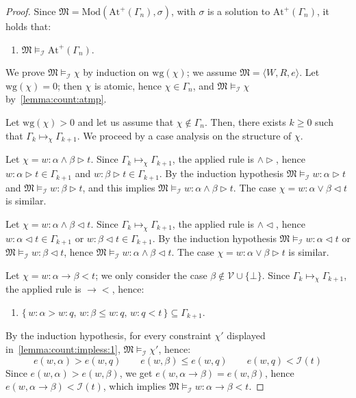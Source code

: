 \documentclass[copyright,creativecommons]{eptcs}
\newcommand{\PV}{\Vcal}
\newcommand{\gt}{\rhd}
\newcommand{\lt}{\lhd}
\newcommand{\stru}[1]{\langle #1 \rangle} %
\newcommand{\wg}[1]{\mathrm{wg}(#1)}
\newcommand{\Atmp}[1]{\mathrm{At}^{+}\!(#1)}
\newcommand{\Modname}{\mathrm{Mod}}
\newcommand{\Mod}[1]{\Modname(#1)}
\newcommand{\app}[3]{#2\mapsto_{#1} #3}
\newcommand{\M}{\mathfrak{M}}
\renewcommand{\a}{\alpha}
\renewcommand{\b}{\beta}
\newcommand{\s}{\sigma}
\newcommand{\G}{\Gamma}
\newcommand{\Ical}{\mathcal{I}}
\newcommand{\Vcal}{\mathcal{V}}
\begin{document}
\begin{proof}
  Since $\M=\Mod{\Atmp{\G_n},\s}$, with $\s$ is a solution to $\Atmp{\G_n}$,
  it holds that:
  \begin{enumerate}[label=(\arabic*), ref=(\arabic*),leftmargin=*]
  \item\label{lemma:count:atmp}
    $\M\models_\Ical \Atmp{\G_n}$.
  \end{enumerate}
  We prove  $\M\models_\Ical \chi$ by induction on $\wg{\chi}$;
  we assume $\M=\stru{W,R,e}$.
  Let $\wg{\chi}=0$; then $\chi$ is atomic, hence $\chi\in\G_n$,
  and $\M\models_\Ical \chi$ by~\ref{lemma:count:atmp}.
  
  Let $\wg{\chi}>0$ and let us assume that  $\chi\not\in \G_n$.
  Then, there exists $k \geq  0$ such that
  $\app{\chi}{\G_k}{\G_{k+1}}$. 
  We proceed by a case analysis on the structure of $\chi$.
  
  
  Let $\chi= w:\a\land \b\gt t$.  Since $\app{\chi}{\G_k}{\G_{k+1}}$,
  the applied rule is $\land\gt$, hence $w:\a\gt t\in \G_{k+1}$ and
  $w:\b \gt t\in \G_{k+1}$.  By the induction hypothesis
  $\M\models_\Ical w:\a\gt t$ and $\M\models_\Ical w:\b \gt t $, and
  this implies $\M\models_\Ical w:\a\land \b\gt t$.  The case $\chi=
  w:\a\lor \b\lt t$ is similar.

  Let $\chi= w:\a\land \b\lt t$.  Since $\app{\chi}{\G_k}{\G_{k+1}}$,
  the applied rule is $\land\lt$, hence $w:\a\lt t \in \G_{k+1}$ or
  $w:\b\lt t \in \G_{k+1}$.  By the induction hypothesis
  $\M\models_\Ical w:\a\lt t $ or $\M\models_\Ical w:\b\lt t $, hence
  $\M\models_\Ical w:\a\land \b\lt t$.  The case $\chi= w:\a\lor \b\gt
  t$ is similar.
 
 
  Let $\chi= w:\a\to \b < t$; we only consider the case
  $\b\not\in\PV\cup\{\bot\}$.  Since $\app{\chi}{\G_k}{\G_{k+1}}$, the
  applied rule is $\to<$, hence:
 \begin{enumerate}[label=(\Alph*), ref=(\Alph*),leftmargin=*]
 \item\label{lemma:count:impless:1}
   $\{\,w:\a > w : q,\, w:\b \leq w : q,\,w: q < t\,\} \subseteq \G_{k+1}$. 
 \end{enumerate}
 By the induction hypothesis,
 for every constraint $\chi'$  displayed in~\ref{lemma:count:impless:1},
 $\M\models_\Ical \chi'$, hence:
 \[
 e(w,\a) > e(w,q) \qquad e(w,\b) \leq e(w,q) \qquad e(w,q) < \Ical(t)
 \]  
 Since $e(w,\a) > e(w,\b)$, we get  $e(w,\a\to \b) = e(w,\b)$, hence  $e(w,\a\to \b) < \Ical(t)$,
 which implies $\M\models_\Ical  w:\a\to \b < t  $.
 

\end{proof}
\end{document}
